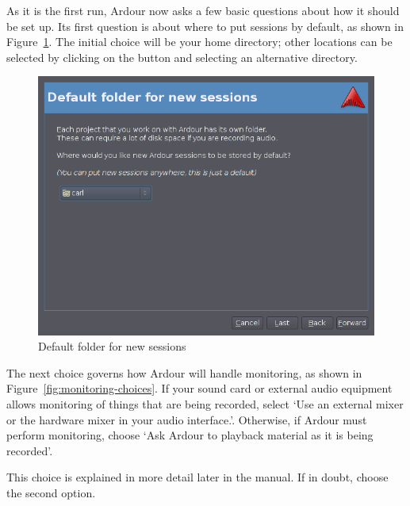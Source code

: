 \documentclass{book}
\begin{document}
As it is the first run, Ardour now asks a few basic questions about
how it should be set up.  Its first question is about where to put
sessions by default, as shown in
Figure~\ref{fig:default-folder-for-new-sessions}.  The initial choice
will be your home directory; other locations can be selected by
clicking on the button and selecting an alternative directory.

\begin{figure}[ht]
\begin{center}
\includegraphics[scale=0.5]{screenshots/default-folder-for-new-sessions.png}
\end{center}
\caption{Default folder for new sessions}
\label{fig:default-folder-for-new-sessions}
\end{figure}

The next choice governs how Ardour will handle monitoring, as shown in
Figure~\ref{fig:monitoring-choices}.  If your sound card or external
audio equipment allows monitoring of things that are being recorded,
select `Use an external mixer or the hardware mixer in your audio
interface.'.  Otherwise, if Ardour must perform monitoring, choose
`Ask Ardour to playback material as it is being recorded'.

This choice is explained in more detail later in the manual.  If in
doubt, choose the second option.
\end{document}
